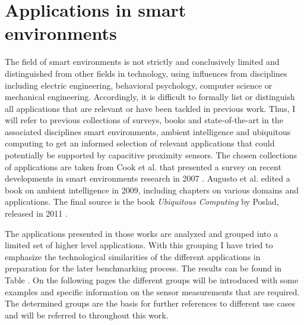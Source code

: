 \section{Applications in smart environments}
The field of smart environments is not strictly and conclusively limited and distinguished from other fields in technology, using influences from disciplines including electric engineering, behavioral psychology, computer science or mechanical engineering. Accordingly, it is difficult to formally list or distinguish all applications that are relevant or have been tackled in previous work. Thus, I will refer to previous collections of surveys, books and state-of-the-art in the associated disciplines smart environments, ambient intelligence and ubiquitous computing to get an informed selection of relevant applications that could potentially be supported by capacitive proximity sensors. The chosen collections of applications are taken from Cook et al. that presented a survey on recent developments in smart environments research in 2007 \cite{cook2007smart}. Augusto et al. edited a book on ambient intelligence in 2009, including chapters on various domains and applications. The final source is the book \emph{Ubiquitous Computing} by Poslad, released in 2011 \cite{poslad2011ubiquitous}.

The applications presented in those works are analyzed and grouped into a limited set of higher level applications. With this grouping I have tried to emphasize the technological similarities of the different applications in preparation for the later benchmarking process. The results can be found in Table . On the following pages the different groups will be introduced with some examples and specific information on the sensor measurements that are required. The determined groups are the basis for further references to different use cases and will be referred to throughout this work.
